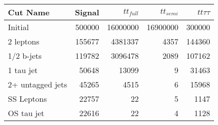 \begin{tabular}{lrrrr}
\toprule
         Cut Name &  Signal &  $tt_{full}$ &  $tt_{semi}$ &  $tt\tau\tau$ \\
\midrule
          Initial &  500000 &     16000000 &     16900000 &        300000 \\
        2 leptons &  155677 &      4381337 &         4357 &        144360 \\
       1/2 b-jets &  119782 &      3096478 &         2089 &        107162 \\
        1 tau jet &   50648 &        13099 &            9 &         31463 \\
 2+ untagged jets &   45265 &         4515 &            6 &         15968 \\
       SS Leptons &   22757 &           22 &            5 &          1147 \\
       OS tau jet &   22616 &           22 &            4 &          1128 \\
\bottomrule
\end{tabular}
